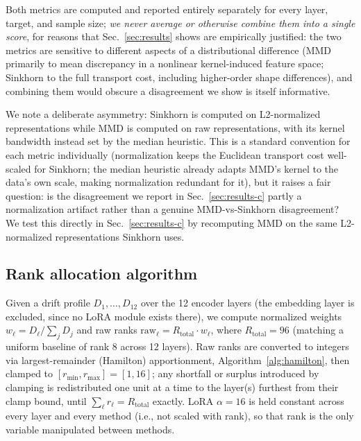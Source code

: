 \documentclass[conference]{IEEEtran}
\begin{document}
Both metrics are computed and reported entirely separately for every layer, target, and sample size; \emph{we never average or otherwise combine them into a single score}, for reasons that Sec.~\ref{sec:results} shows are empirically justified: the two metrics are sensitive to different aspects of a distributional difference (MMD primarily to mean discrepancy in a nonlinear kernel-induced feature space; Sinkhorn to the full transport cost, including higher-order shape differences), and combining them would obscure a disagreement we show is itself informative.

We note a deliberate asymmetry: Sinkhorn is computed on L2-normalized representations while MMD is computed on raw representations, with its kernel bandwidth instead set by the median heuristic. This is a standard convention for each metric individually (normalization keeps the Euclidean transport cost well-scaled for Sinkhorn; the median heuristic already adapts MMD's kernel to the data's own scale, making normalization redundant for it), but it raises a fair question: is the disagreement we report in Sec.~\ref{sec:results-c} partly a normalization artifact rather than a genuine MMD-vs-Sinkhorn disagreement? We test this directly in Sec.~\ref{sec:results-c} by recomputing MMD on the same L2-normalized representations Sinkhorn uses.

\subsection{Rank allocation algorithm}
\label{sec:allocation}
Given a drift profile $D_1,\ldots,D_{12}$ over the 12 encoder layers (the embedding layer is excluded, since no LoRA module exists there), we compute normalized weights $w_\ell = D_\ell / \sum_j D_j$ and raw ranks $\mathrm{raw}_\ell = R_{\mathrm{total}} \cdot w_\ell$, where $R_{\mathrm{total}}=96$ (matching a uniform baseline of rank 8 across 12 layers). Raw ranks are converted to integers via largest-remainder (Hamilton) apportionment, Algorithm~\ref{alg:hamilton}, then clamped to $[r_{\min}, r_{\max}] = [1, 16]$; any shortfall or surplus introduced by clamping is redistributed one unit at a time to the layer(s) furthest from their clamp bound, until $\sum_\ell r_\ell = R_{\mathrm{total}}$ exactly. LoRA $\alpha=16$ is held constant across every layer and every method (i.e., not scaled with rank), so that rank is the only variable manipulated between methods.
\end{document}
